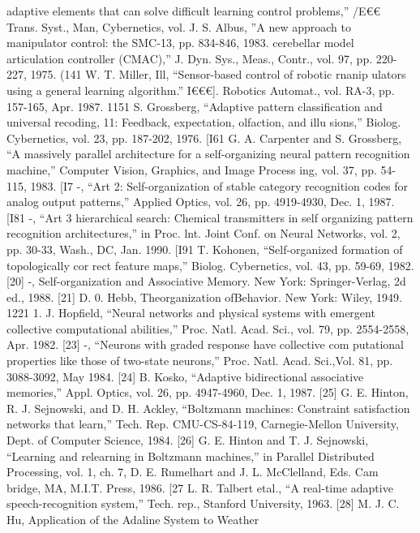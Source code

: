 \documentclass[11pt,a4paper,twocolumn]{article}
\begin{document}
{{adaptive elements that can solve difficult learning control 
problems,” 
/E€€ Trans. Syst., Man, Cybernetics, vol. 
J. S. Albus, ”A new approach to manipulator control: the 
SMC-13, pp. 834-846, 1983. 
cerebellar model articulation controller (CMAC),” J. Dyn. 
Sys., Meas., Contr., vol. 97, pp. 220-227, 1975. 
(141 W. T. Miller, Ill, “Sensor-based control of robotic rnanip
ulators using a general learning algorithm.” I€€€]. Robotics 
Automat., vol. RA-3, pp. 157-165, Apr. 1987. 
1151 S. Grossberg, “Adaptive pattern classification and universal 
recoding, 11: Feedback, expectation, olfaction, and illu
sions,” Biolog. Cybernetics, vol. 23, pp. 187-202, 1976. 
[I61 G. A. Carpenter and S. Grossberg, “A massively parallel 
architecture for a self-organizing neural pattern recognition 
machine,” Computer Vision, Graphics, and Image Process
ing, vol. 37, pp. 54-115, 1983. 
[I7 -, 
“Art 2: Self-organization of stable category recognition 
codes for analog output patterns,” Applied Optics, vol. 26, 
pp. 4919-4930, Dec. 1, 1987. 
[I81 -, 
“Art 3 hierarchical search: Chemical transmitters in self
organizing pattern recognition architectures,” in Proc. lnt. 
Joint Conf. on Neural Networks, vol. 2, pp. 30-33, Wash., 
DC, Jan. 1990. 
[I91 T. Kohonen, “Self-organized formation of topologically cor
rect feature maps,” Biolog. Cybernetics, vol. 43, pp. 59-69, 
1982. 
[20] -, 
Self-organization and Associative Memory. New York: 
Springer-Verlag, 2d ed., 1988. 
[21] D. 0. Hebb, Theorganization ofBehavior. New York: Wiley, 
1949. 
1221 1. J. Hopfield, “Neural networks and physical systems with 
emergent collective computational abilities,” Proc. Natl. 
Acad. Sci., vol. 79, pp. 2554-2558, Apr. 1982. 
[23] -, 
“Neurons with graded response have collective com
putational properties like those of two-state neurons,” Proc. 
Natl. Acad. Sci.,Vol. 81, pp. 3088-3092, May 1984. 
[24] B. Kosko, “Adaptive bidirectional associative memories,” 
Appl. Optics, vol. 26, pp. 4947-4960, Dec. 1, 1987. 
[25] G. E. Hinton, R. J. Sejnowski, and D. H. Ackley, “Boltzmann 
machines: Constraint satisfaction networks that learn,” 
Tech. Rep. CMU-CS-84-119, Carnegie-Mellon University, 
Dept. of Computer Science, 1984. 
[26] G. E. Hinton and T. J. Sejnowski, “Learning and relearning 
in Boltzmann machines,” in Parallel Distributed Processing, 
vol. 1, ch. 7, D. E. Rumelhart and J. L. McClelland, Eds. Cam
bridge, MA, M.I.T. Press, 1986. 
[27 L. R. Talbert etal., “A real-time adaptive speech-recognition 
system,” Tech. rep., Stanford University, 1963. 
[28] M. J. C. Hu, Application of the Adaline System to Weather 
}}
\end{document}
